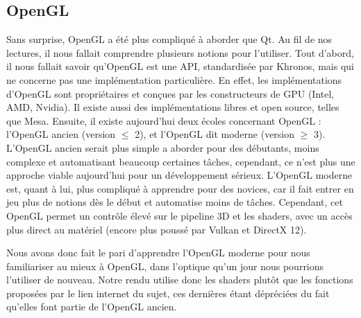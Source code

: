 \documentclass[11pt]{article}
\begin{document}
\subsection{OpenGL}

Sans surprise, OpenGL a été plus compliqué à aborder que Qt. Au fil de nos
lectures, il nous fallait comprendre plusieurs notions pour l'utiliser. Tout
d'abord, il nous fallait savoir qu'OpenGL est une API, standardisée par Khronos,
mais qui ne concerne pas une implémentation particulière. En effet, les
implémentations d'OpenGL sont propriétaires et conçues par les constructeurs de
GPU (Intel, AMD, Nvidia). Il existe aussi des implémentations libres et open
source, telles que Mesa. Ensuite, il existe aujourd'hui deux écoles concernant
OpenGL : l'OpenGL ancien (version $\leq$ 2), et l'OpenGL dit moderne (version
$\geq$ 3). L'OpenGL ancien serait plus simple a aborder pour des débutants,
moins complexe et automatisant beaucoup certaines tâches, cependant, ce n'est
plus une approche viable aujourd'hui pour un développement sérieux. L'OpenGL
moderne est, quant à lui, plus compliqué à apprendre pour des novices, car il
fait entrer en jeu plus de notions dès le début et automatise moins de tâches.
Cependant, cet OpenGL permet un contrôle élevé sur le pipeline 3D et les
shaders, avec un accès plus direct au matériel (encore plus poussé par Vulkan et
DirectX 12).

Nous avons donc fait le pari d'apprendre l'OpenGL moderne pour nous familiariser
au mieux à OpenGL, dans l'optique qu'un jour nous pourrions l'utiliser de
nouveau. Notre rendu utilise donc les shaders plutôt que les fonctions proposées
par le lien internet du sujet, ces dernières étant dépréciées du fait qu'elles
font partie de l'OpenGL ancien. 
\end{document}
